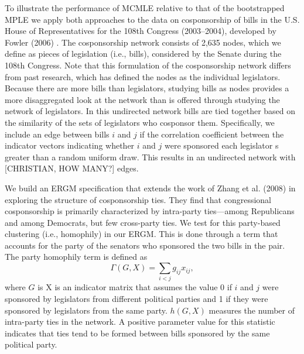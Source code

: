 \documentclass[10pt, conference, compsocconf]{IEEEtran}
\begin{document}
\noindent To illustrate the performance of MCMLE relative to that of the bootstrapped MPLE we apply both approaches to the data on cosponsorship of bills in the U.S. House of Representatives for the 108th Congress (2003--2004), developed by Fowler (2006) \cite{Fowler2006a} \cite{Fowler2006b}. The cosponsorship network consists of 2,635 nodes, which we define as pieces of legislation (i.e., bills), considered by the Senate during the 108th Congress. Note that this formulation of the cosponsorship network differs from past research, which has defined the nodes as the individual legislators. Because there are more bills than legislators, studying bills as nodes provides a more disaggregated look at the network than is offered through studying the network of legislators. In this undirected network bills are tied together based on the similarity of the sets of legislators who cosponsor them. Specifically, we include an edge between bills $i$ and $j$ if the correlation coefficient between the indicator vectors indicating whether $i$ and $j$ were sponsored each legislator s greater than a random uniform draw. This results in an undirected network with [CHRISTIAN, HOW MANY?] edges.

We build an ERGM specification that extends the work of  Zhang et al. (2008) \cite{zhang2008community} in exploring the structure of cosponsorship ties. They find that congressional cosponsorship is primarily characterized by intra-party ties---among Republicans and among Democrats, but few cross-party ties. We test for this party-based clustering (i.e., homophily) in our ERGM. This is done through a term that accounts for the party of the senators who sponsored the two bills in the pair. The party homophily term is defined as $$ \Gamma(G,X) = \sum_{i < j} g_{ij}x_{ij},$$ where $G$ is X is an indicator matrix that assumes the value 0 if $i$ and $j$ were sponsored by legislators from different political parties and 1 if they were sponsored by legislators from the same party.  $h(G,X)$ measures the number of intra-party ties in the network. A positive parameter value for this statistic indicates that ties tend to be formed between bills sponsored by the same political party.
\end{document}
